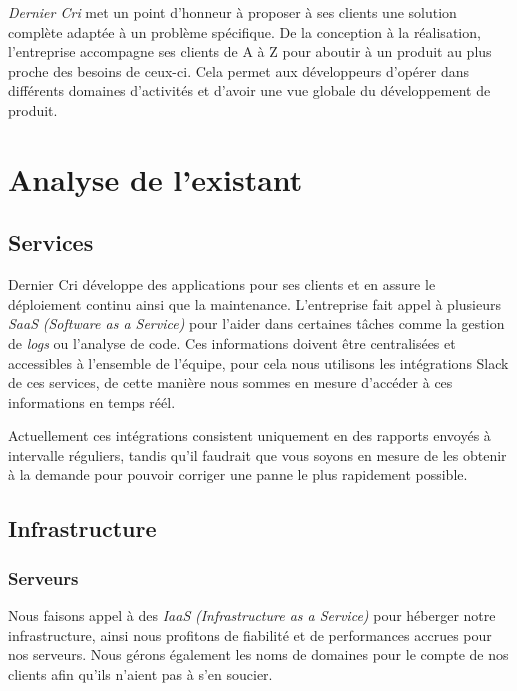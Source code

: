 \bigskip

\emph{Dernier Cri} met un point d'honneur à proposer à ses clients une
solution complète adaptée à un problème spécifique. De la conception à
la réalisation, l'entreprise accompagne ses clients de A à Z pour
aboutir à un produit au plus proche des besoins de ceux-ci. Cela permet
aux développeurs d'opérer dans différents domaines d'activités et
d'avoir une vue globale du développement de produit.

\newpage

\section{Analyse de l'existant}\label{analyse-de-lexistant}

\subsection{Services}\label{services}

Dernier Cri développe des applications pour ses clients et en assure le
déploiement continu ainsi que la maintenance. L'entreprise fait appel à
plusieurs \emph{SaaS} \emph{(Software as a Service)} pour l'aider dans
certaines tâches comme la gestion de \emph{logs} ou l'analyse de code.
Ces informations doivent être centralisées et accessibles à l'ensemble
de l'équipe, pour cela nous utilisons les intégrations Slack de ces
services, de cette manière nous sommes en mesure d'accéder à ces
informations en temps réél.

\bigskip

Actuellement ces intégrations consistent uniquement en des rapports
envoyés à intervalle réguliers, tandis qu'il faudrait que vous soyons en
mesure de les obtenir à la demande pour pouvoir corriger une panne le
plus rapidement possible.

\newpage

\subsection{Infrastructure}\label{infrastructure}

\subsubsection{Serveurs}\label{serveurs}

Nous faisons appel à des \emph{IaaS} \emph{(Infrastructure as a
Service)} pour héberger notre infrastructure, ainsi nous profitons de
fiabilité et de performances accrues pour nos serveurs. Nous gérons
également les noms de domaines pour le compte de nos clients afin qu'ils
n'aient pas à s'en soucier.

